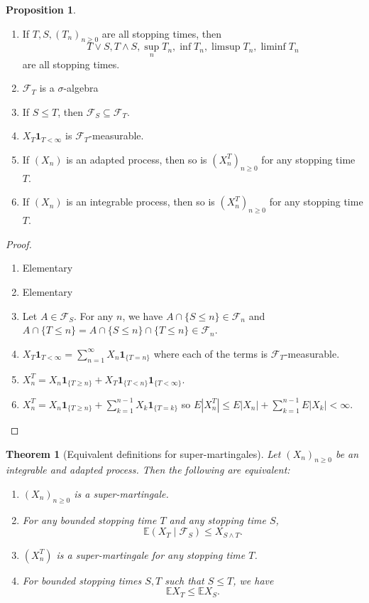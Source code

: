 \documentclass[parskip=full]{article}
\newtheorem{theorem}{Theorem}[section]
\theoremstyle{definition}
\newtheorem{proposition}{Proposition}[section]
\newcommand{\1}{\mathbbm{1}}
\newcommand{\E}{\mathbb{E}}
\begin{document}
\begin{proposition}
  $ $
  \begin{enumerate}
    \item If $T, S, (T_n)_{n \geq 0}$ are all stopping times, then
          \[
            T \vee S, T \wedge S, \sup_n T_n, \inf T_n, \limsup T_n, \liminf T_n
          \]
          are all stopping times.
    \item $\mathcal{F}_T$ is a $\sigma$-algebra
    \item If $S \leq T$, then $\mathcal{F}_S \subseteq \mathcal{F}_T$.
    \item $X_T \mathbf{1}_{T < \infty}$ is $\mathcal{F}_T$-measurable.
    \item If $(X_n)$ is an adapted process, then so is $(X^T_n)_{n \geq 0}$ for any stopping time $T$.
    \item If $(X_n)$ is an integrable process, then so is $(X^T_n)_{n \geq 0}$ for any stopping time $T$.
  \end{enumerate}
\end{proposition}

\begin{proof}
  $ $
  \begin{enumerate}
    \item Elementary
    \item Elementary
    \item Let $A \in \mathcal{F}_S$. For any $n$, we have $A \cap \{S \leq n\} \in \mathcal{F}_n$ and $A \cap \{T \leq n\} = A \cap \{S \leq n\} \cap \{T \leq n\} \in \mathcal{F}_n$.
    \item $X_T \mathbf{1}_{T < \infty} = \sum_{n=1}^\infty X_n \mathbf{1}_{\{T = n\}}$ where each of the terms is $\mathcal{F}_T$-measurable.
    \item $X^T_n = X_n \mathbf{1}_{\{T \geq n\}} + X_T \mathbf{1}_{\{T < n\}} \mathbf{1}_{\{T < \infty\}}$.
    \item $X^T_n = X_n \mathbf{1}_{\{T \geq n\}} + \sum _{k=1}^{n-1} X_k \mathbf{1}_{\{T = k\}}$ so $E |X^T_n| \leq E|X_n| + \sum_{k=1}^{n-1} E|X_k| < \infty$.
  \end{enumerate}
\end{proof}

\begin{theorem}[Equivalent definitions for super-martingales]
  Let $(X_n)_{n \geq 0}$ be an integrable and adapted process. Then the following are equivalent:
  \begin{enumerate}
    \item $(X_n)_{n \geq 0}$ is a super-martingale.
    \item For any bounded stopping time $T$ and any stopping time $S$,
          \[
            \E(X_T \mid \mathcal{F}_S) \leq X_{S \wedge T}.
          \]
    \item $(X_n^T)$ is a super-martingale for any stopping time $T$.
    \item \label{super martingale: monotone} For bounded stopping times $S, T$ such that $S \leq T$, we have
          \[
            \E X_T \leq \E X_S.
          \]
  \end{enumerate}
\end{theorem}
\end{document}
